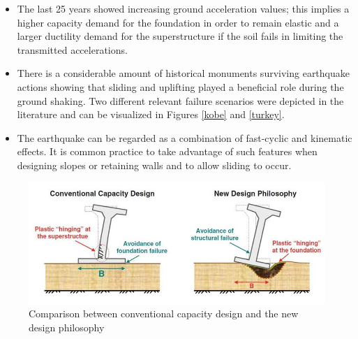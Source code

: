 \documentclass[12pt,a4paper]{report}
\begin{document}
\begin{itemize}
	\item The last 25 years showed increasing ground acceleration values; this implies a higher capacity demand for the foundation in order to remain elastic and a larger ductility demand for the superstructure if the soil fails in limiting the transmitted accelerations.
	\item There is a considerable amount of historical monuments surviving earthquake actions showing that sliding and uplifting played a beneficial role during the ground shaking. Two different relevant failure scenarios were depicted in the literature and can be visualized in Figures \ref{kobe} and \ref{turkey}.
	\item The earthquake can be regarded as a combination of fast-cyclic and kinematic effects. It is common practice to take advantage of such features when designing slopes or retaining walls and to allow sliding to occur.
\end{itemize}

\begin{figure}[h!]
	\centering
	\includegraphics[width=0.9\linewidth]{"new_phil"}
	\caption{Comparison between conventional capacity design and the new design philosophy}
	\label{comp}
\end{figure}
\end{document}
